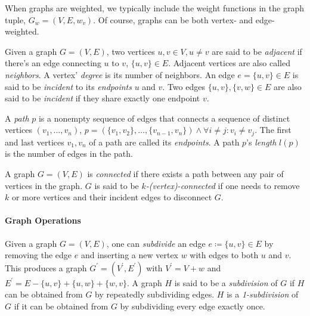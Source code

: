 When graphs are weighted, we typically include the weight functions in the graph tuple, \eg{} $G_w = (V,E,w_v)$.
Of course, graphs can be both vertex- and edge-weighted.

\begin{definition}
Given a graph $G = (V, E)$, two vertices $u, v \in V, u \neq v$ are said to be \emph{adjacent} if there's an edge connecting $u$ to $v$, \ie{} $\{u, v\} \in E$.
Adjacent vertices are also called \emph{neighbors}.
A vertex' \emph{degree} is its number of neighbors.
An edge $e = \{u, v\} \in E$ is said to be \emph{incident} to its \emph{endpoints} $u$ and $v$.
Two edges $\{u,v\}, \{v,w\} \in E$ are also said to be \emph{incident} if they share exactly one endpoint $v$.
\end{definition}

\begin{definition}
A \emph{path} $p$ is a nonempty sequence of edges that connects a sequence of distinct vertices $(v_1, \dots, v_n)$, \ie{} $p = (\{v_1, v_2\}, \dots, \{v_{n-1},v_n\}) \land \forall i \neq j \colon v_i \neq v_j$.
The first and last vertices $v_1, v_n$ of a path are called its \emph{endpoints}.
A path $p$'s \emph{length} $l(p)$ is the number of edges in the path.
\end{definition}

\begin{definition}
A graph $G = (V, E)$ is \emph{connected} if there exists a path between any pair of vertices in the graph.
$G$ is said to be \emph{$k$-(vertex)-connected} if one needs to remove $k$ or more vertices and their incident edges to disconnect $G$.
\end{definition}



\paragraph{Graph Operations}

\begin{definition}
Given a graph $G = (V, E)$, one can \emph{subdivide} an edge $e \coloneqq \{u,v\} \in E$ by removing the edge $e$ and inserting a new vertex $w$ with edges to both $u$ and $v$.
This produces a graph $G^\prime = (V^\prime, E^\prime)$ with $V^\prime = V + w$ and $E^\prime = E - \{u,v\} + \{u,w\} + \{w,v\}$.
A graph $H$ is said to be a \emph{subdivision} of $G$ if $H$ can be obtained from $G$ by repeatedly subdividing edges.
$H$ is a \emph{1-subdivision} of $G$ if it can be obtained from $G$ by subdividing every edge exactly once.
\end{definition}

